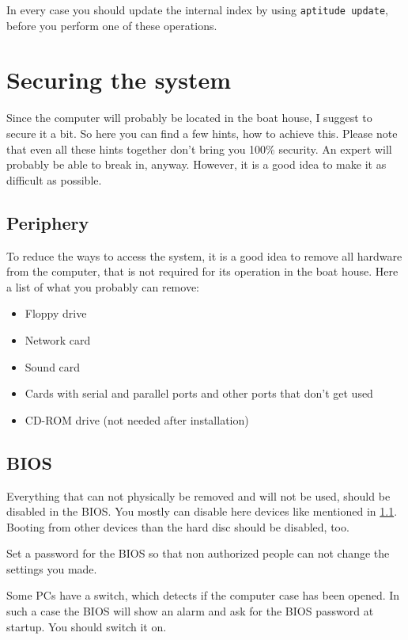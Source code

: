 \documentclass[a4paper,12pt,twoside]{article}
\begin{document}
In every case you should update the internal index by using
\texttt{aptitude update}, before you perform one
of these operations.


\section{Securing the system}
\label{sct:system_secure}
Since the computer will probably be
located in the boat house, I suggest to secure it a bit. So here you
can find a few hints, how to achieve this. Please note that even all
these hints together don't bring you 100\% security.
An expert will probably be able to break in, anyway. However, it is a
good idea to make it as difficult as possible.


\subsection{Periphery}
\label{sct:periphery}
To reduce the ways to access the system,
it is a good idea to remove all hardware from the computer, that is not
required for its operation in the boat house. Here a list of what you
probably can remove:

\begin{itemize}
    \item Floppy drive
    \item Network card
    \item Sound card
    \item Cards with serial and parallel ports and other ports that
        don't get used
    \item CD-ROM drive (not needed after installation)
\end{itemize}


\subsection{BIOS}
\label{sct:bios}
Everything that can not physically be removed and will not be used,
should be disabled in the BIOS. You mostly can disable here devices
like mentioned in \ref{sct:periphery}. Booting from other devices than 
the hard disc should be disabled, too.

Set a password for the BIOS so that non authorized people can not change
the settings you made.

Some PCs have a switch, which detects if the computer case has been
opened. In such a case the BIOS will show an alarm and ask for the BIOS
password at startup. You should switch it on.
\end{document}
